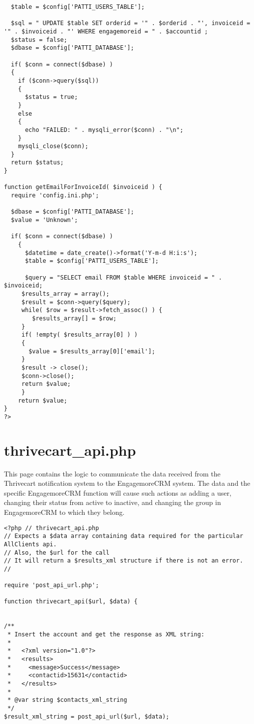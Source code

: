 \documentclass[final,letterpaper,12pt]{article}
\begin{document}
\begin{appendices}
\begin{verbatim}
  $table = $config['PATTI_USERS_TABLE'];

  $sql = " UPDATE $table SET orderid = '" . $orderid . "', invoiceid = '" . $invoiceid . "' WHERE engagemoreid = " . $accountid ;
  $status = false;
  $dbase = $config['PATTI_DATABASE'];

  if( $conn = connect($dbase) )
  {
    if ($conn->query($sql))
    {
      $status = true;
    }
    else
    {
      echo "FAILED: " . mysqli_error($conn) . "\n";
    }
    mysqli_close($conn);
  }
  return $status;
}

function getEmailForInvoiceId( $invoiceid ) {
  require 'config.ini.php';

  $dbase = $config['PATTI_DATABASE'];
  $value = 'Unknown';

  if( $conn = connect($dbase) )
    {
      $datetime = date_create()->format('Y-m-d H:i:s');
      $table = $config['PATTI_USERS_TABLE'];

      $query = "SELECT email FROM $table WHERE invoiceid = " . $invoiceid;
     $results_array = array();
     $result = $conn->query($query);
     while( $row = $result->fetch_assoc() ) {
        $results_array[] = $row;
     }
     if( !empty( $results_array[0] ) )
     {
       $value = $results_array[0]['email'];
     }
     $result -> close();
     $conn->close();
     return $value;
     }
    return $value;
}
?>
\end{verbatim}
\section{thrivecart\_api.php}
\noindent This page contains the logic to communicate the data received from the Thrivecart notification system to the EngagemoreCRM system.  The data and the specific EngagemoreCRM function will cause such actions as adding a user, changing their status from active to inactive, and changing the group in EngagemoreCRM to which they belong.
\begin{verbatim}
<?php // thrivecart_api.php
// Expects a $data array containing data required for the particular AllClients api.
// Also, the $url for the call
// It will return a $results_xml structure if there is not an error.
//

require 'post_api_url.php';

function thrivecart_api($url, $data) {


/**
 * Insert the account and get the response as XML string:
 *
 *   <?xml version="1.0"?>
 *   <results>
 *     <message>Success</message>
 *     <contactid>15631</contactid>
 *   </results>
 *
 * @var string $contacts_xml_string
 */
$result_xml_string = post_api_url($url, $data);


\end{verbatim}
\end{appendices}
\end{document}
